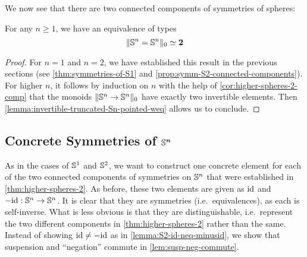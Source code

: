 \documentclass[english,a4]{article}
\newcommand{\setTrunc}[1]{\Trunc{#1}_0}
\begin{document}
We now see that there are two connected components of symmetries of spheres:
\begin{theorem} \label{thm:higher-spheres-2}
    For any $n \geq 1$, we have an equivalence of types
    \begin{equation}
    \higherTrunc 0 {\Sn n= \Sn n} \weq \bn 2
    \end{equation} 
\end{theorem}
\begin{proof}
  For $n = 1$ and $n=2$, we have established this result in the previous
  sections (see \cref{thm:symmetries-of-S1} and
  \cref{prop:symm-S2-connected-components}).  For higher $n$, it follows by
  induction on $n$ with the help of \cref{cor:higher-spheres-2-comp} that the
  monoids $\setTrunc{\Sn n \to \Sn n}$ have exactly two invertible elements.
  Then \cref{lemma:invertible-truncated-Sn-pointed-weq} allows us to conclude.
\end{proof}

\subsection{Concrete Symmetries of $\boldsymbol{\Sn n}$}





As in the cases of $\Sc$ and $\Sp$, we want to construct one concrete element for each of the two connected components of symmetries on $\Sn n$ that were established in \cref{thm:higher-spheres-2}.
As before, these two elements are given as $\id$ and $-\id : \Sn n \to \Sn n$.
It is clear that they are symmetries (i.e.\ equivalences), as each is self-inverse.
What is less obvious is that they are distinguishable, i.e.\ represent the two different components in \cref{thm:higher-spheres-2} rather than the same.
Instead of showing $\id \neq -\id$ as in \cref{lemma:S2-id-neq-minusid}, we show that suspension and ``negation'' commute in \cref{lem:susp-neg-commute}.
\end{document}
